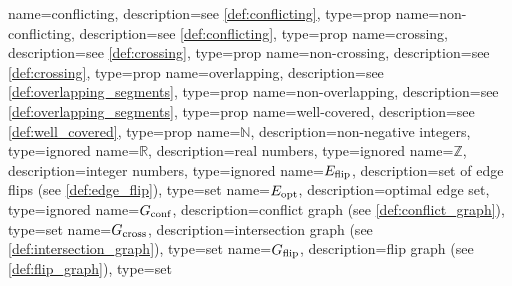 \renewcommand*{\glspostdescription}{}
\DeclareRobustCommand{\glspropstyle}[1]{\textit{#1}}
\defglsdisplay[prop]{\glspropstyle{#1#4}}
\defglsdisplayfirst[prop]{\glspropstyle{#1#4}}
{
  name={conflicting},
  description={see \cref{def:conflicting}},
  type={prop}
}
{
  name={non-conflicting},
  description={see \cref{def:conflicting}},
  type={prop}
}
{
  name={crossing},
  description={see \cref{def:crossing}},
  type={prop}
}
{
  name={non-crossing},
  description={see \cref{def:crossing}},
  type={prop}
}
{
  name={overlapping},
  description={see \cref{def:overlapping_segments}},
  type={prop}
}
{
  name={non-overlapping},
  description={see \cref{def:overlapping_segments}},
  type={prop}
}
{
  name={well-covered},
  description={see \cref{def:well_covered}},
  type={prop}
}
{
  name={\ensuremath{\mathbb{N}}},
  description={non-negative integers},
  type={ignored}
}
{
  name={\ensuremath{\mathbb{R}}},
  description={real numbers},
  type={ignored}
}
{
  name={\ensuremath{\mathbb{Z}}},
  description={integer numbers},
  type={ignored}
}
{
  name={\ensuremath{E_\textnormal{flip}}},
  description={set of edge flips (see \cref{def:edge_flip})},
  type={set}
}
{
  name={\ensuremath{E_\textnormal{opt}}},
  description={optimal edge set},
  type={ignored}
}
{
  name={\ensuremath{G_\textnormal{conf}}},
  description={conflict graph (see \cref{def:conflict_graph})},
  type={set}
}
{
  name={\ensuremath{G_\textnormal{cross}}},
  description={intersection graph (see \cref{def:intersection_graph})},
  type={set}
}
{
  name={\ensuremath{G_\textnormal{flip}}},
  description={flip graph (see \cref{def:flip_graph})},
  type={set}
}
